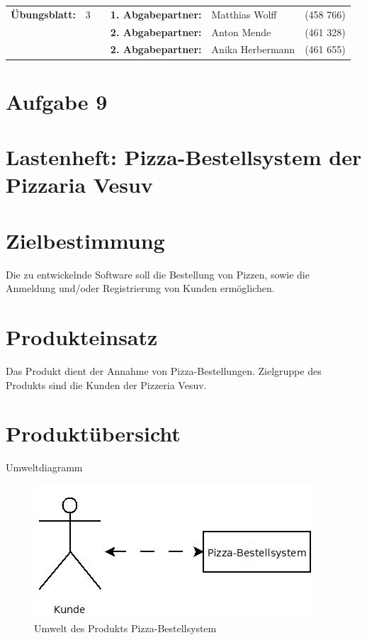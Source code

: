 \newcommand{\obenlinks}{Software Engineering}		%

\usepackage{float}


	\begin{center}
		\begin{tabular}{|rlp{4cm}rll|}
		\hline
		 \textbf{Übungsblatt:} & 3 &   & \textbf{1. Abgabepartner:} & Matthias Wolff & (458 766)  \\
		        & & & \textbf{2. Abgabepartner:} & Anton Mende & (461 328) \\
		        & & & \textbf{2. Abgabepartner:} & Anika Herbermann & (461 655) \\ \hline
		\end{tabular}
	\end{center}
\section*{Aufgabe 9}
\section*{Lastenheft: Pizza-Bestellsystem der Pizzaria Vesuv}
\section{Zielbestimmung}
Die zu entwickelnde Software soll die Bestellung von Pizzen, sowie die Anmeldung und/oder Registrierung von Kunden ermöglichen.
\section{Produkteinsatz}
Das Produkt dient der Annahme von Pizza-Bestellungen. Zielgruppe des Produkts sind die Kunden der Pizzeria Vesuv.
\section{Produktübersicht}
Umweltdiagramm
\begin{figure}[htp]
	\centering
\includegraphics[keepaspectratio]{Umweltdiagramm.jpeg}
\caption {Umwelt des Produkts Pizza-Bestellsystem}
\end{figure}
